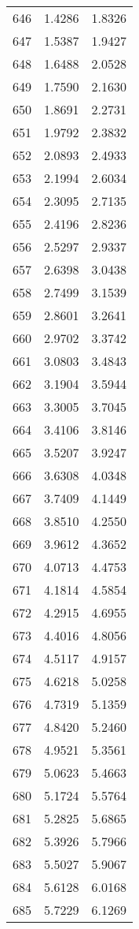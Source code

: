 \documentclass{article}
\begin{document}
\begin{longtable}{|c|c|c|}
646 & 1.4286 & 1.8326 \\
647 & 1.5387 & 1.9427 \\
648 & 1.6488 & 2.0528 \\
649 & 1.7590 & 2.1630 \\
650 & 1.8691 & 2.2731 \\
651 & 1.9792 & 2.3832 \\
652 & 2.0893 & 2.4933 \\
653 & 2.1994 & 2.6034 \\
654 & 2.3095 & 2.7135 \\
655 & 2.4196 & 2.8236 \\
656 & 2.5297 & 2.9337 \\
657 & 2.6398 & 3.0438 \\
658 & 2.7499 & 3.1539 \\
659 & 2.8601 & 3.2641 \\
660 & 2.9702 & 3.3742 \\
661 & 3.0803 & 3.4843 \\
662 & 3.1904 & 3.5944 \\
663 & 3.3005 & 3.7045 \\
664 & 3.4106 & 3.8146 \\
665 & 3.5207 & 3.9247 \\
666 & 3.6308 & 4.0348 \\
667 & 3.7409 & 4.1449 \\
668 & 3.8510 & 4.2550 \\
669 & 3.9612 & 4.3652 \\
670 & 4.0713 & 4.4753 \\
671 & 4.1814 & 4.5854 \\
672 & 4.2915 & 4.6955 \\
673 & 4.4016 & 4.8056 \\
674 & 4.5117 & 4.9157 \\
675 & 4.6218 & 5.0258 \\
676 & 4.7319 & 5.1359 \\
677 & 4.8420 & 5.2460 \\
678 & 4.9521 & 5.3561 \\
679 & 5.0623 & 5.4663 \\
680 & 5.1724 & 5.5764 \\
681 & 5.2825 & 5.6865 \\
682 & 5.3926 & 5.7966 \\
683 & 5.5027 & 5.9067 \\
684 & 5.6128 & 6.0168 \\
685 & 5.7229 & 6.1269 \\

\end{longtable}
\end{document}
